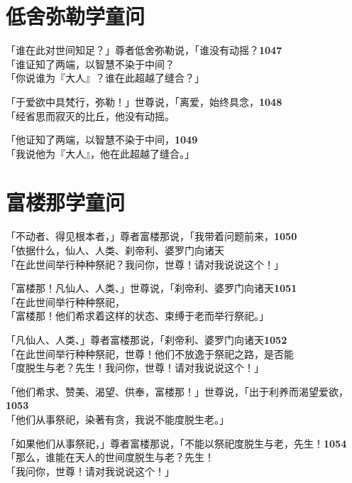 \section{低舍弥勒学童问}


「谁在此对世间知足？」尊者低舍弥勒说，「谁没有动摇？\hfill{\grayfootnotesize \textbf{1047}} \\
「谁证知了两端，以智慧不染于中间？\\
「你说谁为『大人』？谁在此超越了缝合？」


「于爱欲中具梵行，弥勒！」世尊说，「离爱，始终具念，\hfill{\grayfootnotesize \textbf{1048}} \\
「经省思而寂灭的比丘，他没有动摇。


「他证知了两端，以智慧不染于中间，\hfill{\grayfootnotesize \textbf{1049}} \\
「我说他为『大人』，他在此超越了缝合。」


\section{富楼那学童问}

「不动者、得见根本者，」尊者富楼那说，「我带着问题前来，\hfill{\grayfootnotesize \textbf{1050}} \\
「依据什么，仙人、人类、刹帝利、婆罗门向诸天\\
「在此世间举行种种祭祀？我问你，世尊！请对我说说这个！」


「富楼那！凡仙人、人类、」世尊说，「刹帝利、婆罗门向诸天\hfill{\grayfootnotesize \textbf{1051}} \\
「在此世间举行种种祭祀，\\
「富楼那！他们希求着这样的状态、束缚于老而举行祭祀。」


「凡仙人、人类、」尊者富楼那说，「刹帝利、婆罗门向诸天\hfill{\grayfootnotesize \textbf{1052}} \\
「在此世间举行种种祭祀，世尊！他们不放逸于祭祀之路，是否能\\
「度脱生与老？先生！我问你，世尊！请对我说说这个！」


「他们希求、赞美、渴望、供奉，富楼那！」世尊说，「出于利养而渴望爱欲，\hfill{\grayfootnotesize \textbf{1053}} \\
「他们从事祭祀，染著有贪，我说不能度脱生老。」


「如果他们从事祭祀，」尊者富楼那说，「不能以祭祀度脱生与老，先生！\hfill{\grayfootnotesize \textbf{1054}} \\
「那么，谁能在天人的世间度脱生与老？先生！\\
「我问你，世尊！请对我说说这个！」

